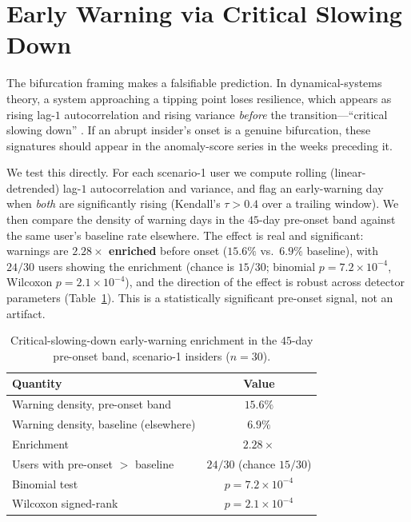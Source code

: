 \documentclass[11pt]{article}
\begin{document}
\section{Early Warning via Critical Slowing Down}
\label{sec:ews}

The bifurcation framing makes a falsifiable prediction. In dynamical-systems
theory, a system approaching a tipping point loses resilience, which appears
as rising lag-$1$ autocorrelation and rising variance \emph{before} the
transition---``critical slowing down'' \cite{scheffer2009}. If an abrupt
insider's onset is a genuine bifurcation, these signatures should appear in
the anomaly-score series in the weeks preceding it.

We test this directly. For each scenario-1 user we compute rolling
(linear-detrended) lag-$1$ autocorrelation and variance, and flag an
early-warning day when \emph{both} are significantly rising (Kendall's
$\tau > 0.4$ over a trailing window). We then compare the density of warning
days in the $45$-day pre-onset band against the same user's baseline rate
elsewhere. The effect is real and significant: warnings are
\textbf{$2.28\times$ enriched} before onset ($15.6\%$ vs.\ $6.9\%$ baseline),
with $24/30$ users showing the enrichment (chance is $15/30$; binomial
$p = 7.2\times10^{-4}$, Wilcoxon $p = 2.1\times10^{-4}$), and the direction
of the effect is robust across detector parameters (Table~\ref{tab:ews}).
This is a statistically significant pre-onset signal, not an artifact.

\begin{table}[t]
  \centering
  \caption{Critical-slowing-down early-warning enrichment in the $45$-day
  pre-onset band, scenario-1 insiders ($n=30$).}
  \label{tab:ews}
  \begin{tabular}{lc}
    \toprule
    Quantity & Value \\
    \midrule
    Warning density, pre-onset band & $15.6\%$ \\
    Warning density, baseline (elsewhere) & $6.9\%$ \\
    Enrichment & $2.28\times$ \\
    Users with pre-onset $>$ baseline & $24/30$ (chance $15/30$) \\
    Binomial test & $p = 7.2\times10^{-4}$ \\
    Wilcoxon signed-rank & $p = 2.1\times10^{-4}$ \\
    \bottomrule
  \end{tabular}
\end{table}
\end{document}
